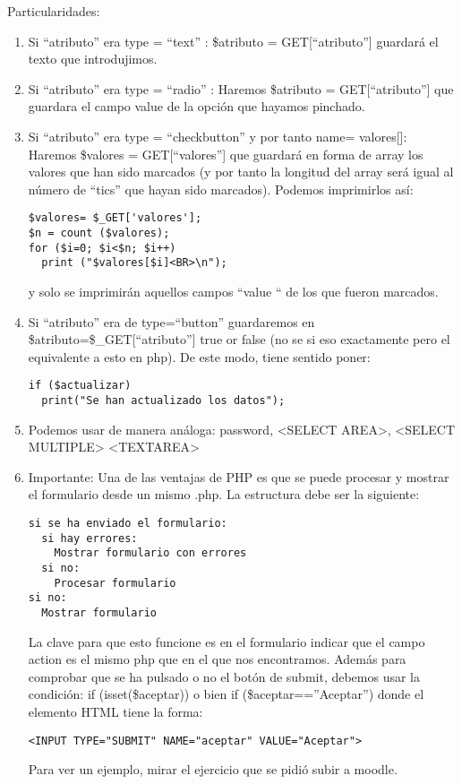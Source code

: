 \documentclass{apuntes}
\begin{document}
Particularidades:
\begin{enumerate}
\item Si “atributo” era type = “text” : \$atributo = GET[“atributo”] guardará el texto que introdujimos.

\item Si “atributo” era type = “radio” : Haremos \$atributo = GET[“atributo”] que guardara el campo value de la opción que hayamos pinchado.

\item Si “atributo” era type = “checkbutton”  y por tanto name= valores[]: Haremos \$valores = GET[“valores”] que guardará en forma de array los valores que han sido marcados (y por tanto la longitud del array será igual al número de “tics” que hayan sido marcados). Podemos imprimirlos así:
\begin{verbatim}
$valores= $_GET['valores'];
$n = count ($valores);
for ($i=0; $i<$n; $i++)
  print ("$valores[$i]<BR>\n");
\end{verbatim}
y solo se imprimirán aquellos campos “value “ de los que fueron marcados.

\item Si “atributo” era de type=“button” guardaremos en \$atributo=\$\_GET[“atributo”] true or false (no se si eso exactamente pero el equivalente a esto en php). De este modo, tiene sentido poner:
\begin{verbatim}
if ($actualizar)
  print("Se han actualizado los datos");
\end{verbatim}

\item Podemos usar de manera análoga: password, <SELECT AREA>, <SELECT MULTIPLE> <TEXTAREA>

\item Importante:
Una de las ventajas de PHP es que se puede procesar y mostrar el formulario desde un mismo .php. La estructura debe ser la siguiente:
\begin{verbatim}
si se ha enviado el formulario:
  si hay errores:
    Mostrar formulario con errores
  si no:
    Procesar formulario
si no:
  Mostrar formulario
\end{verbatim}
La clave para que esto funcione es en el formulario indicar que el campo action es el mismo php que en el que nos encontramos. Además para comprobar que se ha pulsado o no el botón de submit, debemos usar la condición:
if (isset(\$aceptar)) o bien if (\$aceptar==”Aceptar”) donde el elemento HTML tiene la forma:
\begin{verbatim}
<INPUT TYPE="SUBMIT" NAME="aceptar" VALUE="Aceptar">
\end{verbatim}

Para ver un ejemplo, mirar el ejercicio que se pidió subir a moodle.
\end{enumerate}
\end{document}
